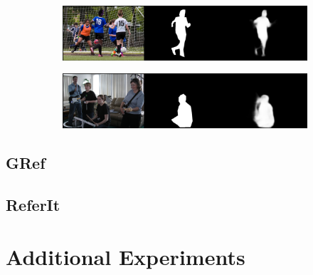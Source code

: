 \begin{figure}[!htbp]
    \begin{subfigure}[b]{\columnwidth}
            \centering
            \includegraphics[width=\textwidth]{./figures/unc_plus_samples/5.png}
    \end{subfigure}
    
    \begin{subfigure}[b]{\columnwidth}
            \centering
            \includegraphics[width=\textwidth]{./figures/unc_plus_samples/6.png}
    \end{subfigure}
    \caption{}
    \label{Fig:Intro_Descr}
\end{figure}

\subsection*{GRef}
\subsection*{ReferIt}

\section{Additional Experiments}